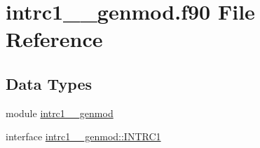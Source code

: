 \hypertarget{intrc1____genmod_8f90}{\section{intrc1\+\_\+\+\_\+genmod.\+f90 File Reference}
\label{intrc1____genmod_8f90}
}
\subsection*{Data Types}
\begin{DoxyCompactItemize}
\item 
module \hyperlink{classintrc1____genmod}{intrc1\+\_\+\+\_\+genmod}
\item 
interface \hyperlink{interfaceintrc1____genmod_1_1INTRC1}{intrc1\+\_\+\+\_\+genmod\+::\+I\+N\+T\+R\+C1}
\end{DoxyCompactItemize}
